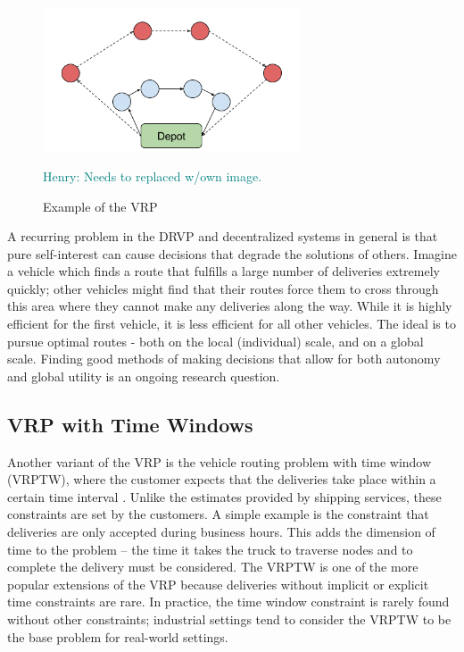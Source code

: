 \documentclass{sig-alternate}
\newcommand{\allcomments}[1]{{#1}}
\newcommand{\hfcomment}[1]{\textcolor{Teal}{\allcomments{Henry: {#1}}}}
\begin{document}
\begin{figure}[h]
\centering
\includegraphics[width=3in, keepaspectratio]{utility.png}
\caption{Example of the VRP}
\hfcomment{Needs to replaced w/own image.}
\label{fig:VRPgraph}
\end{figure}
 A recurring problem in the DRVP and decentralized systems in general is that pure self-interest can cause decisions that degrade the solutions of others. Imagine a vehicle which finds a route that fulfills a large number of deliveries extremely quickly; other vehicles might find that their routes force them to cross through this area where they cannot make any deliveries along the way. While it is highly efficient for the first vehicle, it is less efficient for all other vehicles. The ideal is to pursue optimal routes - both on the local (individual) scale, and on a global scale. Finding good methods of making decisions that allow for both autonomy and global utility is an ongoing research question. 
\subsection{VRP with Time Windows}
Another variant of the VRP is the vehicle routing problem with time window (VRPTW), where the customer expects that the deliveries take place within a certain time interval \cite{Caceres-Cruz:2014}. Unlike the estimates provided by shipping services, these constraints are set by the customers. A simple example is the constraint that deliveries are only accepted during business hours. This adds the dimension of time to the problem -- the time it takes the truck to traverse nodes and to complete the delivery must be considered. The VRPTW is one of the more popular extensions of the VRP because deliveries without implicit or explicit time constraints are rare. In practice, the time window constraint is rarely found without other constraints; industrial settings tend to consider the VRPTW to be the base problem for real-world settings. 
\end{document}
